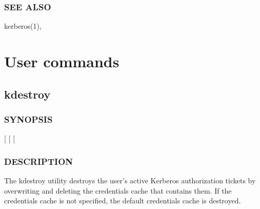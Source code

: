 \documentclass[letterpaper,10pt,english]{sphinxmanual}
\begin{document}
\subsection{SEE ALSO}
\label{\detokenize{user/user_config/k5identity:see-also}}
kerberos(1), 


\chapter{User commands}
\label{\detokenize{user/user_commands/index::doc}}\label{\detokenize{user/user_commands/index:user-commands}}\label{\detokenize{user/user_commands/index:id1}}

\section{kdestroy}
\label{\detokenize{user/user_commands/kdestroy:kdestroy}}\label{\detokenize{user/user_commands/kdestroy::doc}}\label{\detokenize{user/user_commands/kdestroy:kdestroy-1}}

\subsection{SYNOPSIS}
\label{\detokenize{user/user_commands/kdestroy:synopsis}}
{[}\sphinxstylestrong{-A}{]}
{[}\sphinxstylestrong{-q}{]}
{[} \sphinxstyleemphasis{cache\_name}{]}


\subsection{DESCRIPTION}
\label{\detokenize{user/user_commands/kdestroy:description}}
The kdestroy utility destroys the user’s active Kerberos authorization
tickets by overwriting and deleting the credentials cache that
contains them.  If the credentials cache is not specified, the default
credentials cache is destroyed.
\end{document}
